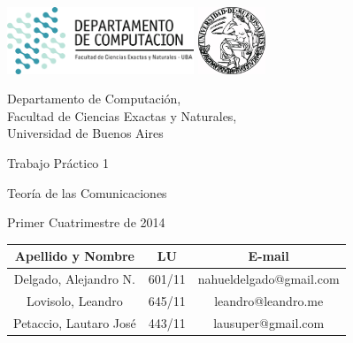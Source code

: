 \documentclass[a4paper, 10pt, twoside]{article}
\begin{document}


\thispagestyle{caratula}

\begin{center}

\includegraphics[height=2cm]{DC.png} 
\hfill
\includegraphics[height=2cm]{UBA.jpg} 

\vspace{2cm}

Departamento de Computación,\\
Facultad de Ciencias Exactas y Naturales,\\
Universidad de Buenos Aires

\vspace{4cm}

\begin{Huge}
Trabajo Práctico 1
\end{Huge}

\vspace{0.5cm}

\begin{Large}
Teoría de las Comunicaciones
\end{Large}

\vspace{1cm}

Primer Cuatrimestre de 2014

\vspace{4cm}

\begin{tabular}{|c|c|c|}
\hline
Apellido y Nombre & LU & E-mail\\
\hline
Delgado, Alejandro N.  & 601/11 & nahueldelgado@gmail.com\\
Lovisolo, Leandro      & 645/11 & leandro@leandro.me\\
Petaccio, Lautaro José & 443/11 & lausuper@gmail.com\\
\hline
\end{tabular}

\end{center}
\end{document}

